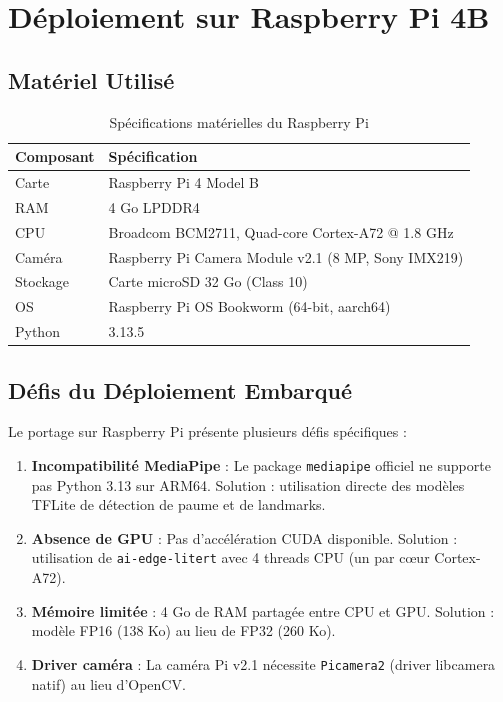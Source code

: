 \chapter{Déploiement sur Raspberry Pi 4B}

\section{Matériel Utilisé}

\begin{table}[H]
    \centering
    \begin{tabular}{ll}
        \toprule
        \textbf{Composant} & \textbf{Spécification} \\
        \midrule
        Carte & Raspberry Pi 4 Model B \\
        RAM & 4 Go LPDDR4 \\
        CPU & Broadcom BCM2711, Quad-core Cortex-A72 @ 1.8 GHz \\
        Caméra & Raspberry Pi Camera Module v2.1 (8 MP, Sony IMX219) \\
        Stockage & Carte microSD 32 Go (Class 10) \\
        OS & Raspberry Pi OS Bookworm (64-bit, aarch64) \\
        Python & 3.13.5 \\
        \bottomrule
    \end{tabular}
    \caption{Spécifications matérielles du Raspberry Pi}
\end{table}

\section{Défis du Déploiement Embarqué}

Le portage sur Raspberry Pi présente plusieurs défis spécifiques :

\begin{enumerate}
    \item \textbf{Incompatibilité MediaPipe} : Le package \texttt{mediapipe} officiel ne supporte pas Python 3.13 sur ARM64. Solution : utilisation directe des modèles TFLite de détection de paume et de landmarks.
    \item \textbf{Absence de GPU} : Pas d'accélération CUDA disponible. Solution : utilisation de \texttt{ai-edge-litert} avec 4 threads CPU (un par cœur Cortex-A72).
    \item \textbf{Mémoire limitée} : 4 Go de RAM partagée entre CPU et GPU. Solution : modèle FP16 (138 Ko) au lieu de FP32 (260 Ko).
    \item \textbf{Driver caméra} : La caméra Pi v2.1 nécessite \texttt{Picamera2} (driver libcamera natif) au lieu d'OpenCV.
\end{enumerate}

